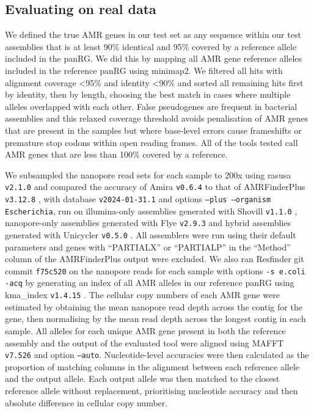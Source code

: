 \subsection*{Evaluating on real data}

We defined the true AMR genes in our test set as any sequence within our test assemblies that is at least 90\% identical and 95\% covered by a reference allele included in the panRG. We did this by mapping all AMR gene reference alleles included in the reference panRG using minimap2. We filtered all hits with alignment coverage <95\% and identity <90\% and sorted all remaining hits first by identity, then by length, choosing the best match in cases where multiple alleles overlapped with each other. False pseudogenes are frequent in bacterial assemblies and this relaxed coverage threshold avoids penalisation of AMR genes that are present in the samples but where base-level errors cause frameshifts or premature stop codons within open reading frames. All of the tools tested call AMR genes that are less than 100\% covered by a reference. 

We subsampled the nanopore read sets for each sample to 200x using rasusa \texttt{v2.1.0} \cite{Hall2022}  and compared the accuracy of Amira \texttt{v0.6.4} to that of AMRFinderPlus \texttt{v3.12.8} \cite{Feldgarden2021}, with database \texttt{v2024-01-31.1} and options \texttt{--plus --organism Escherichia}, run on illumina-only assemblies generated with Shovill \texttt{v1.1.0} \cite{Shovill, Bankevich2012}, nanopore-only assemblies generated with Flye \texttt{v2.9.3} \cite{Kolmogorov2019} and hybrid assemblies generated with Unicycler \texttt{v0.5.0} \cite{Wick2017}. All assemblers were run using their default parameters and genes with “PARTIALX” or “PARTIALP” in the “Method” column of the AMRFinderPlus output were excluded. We also ran Resfinder \cite{Florensa2022} git commit \texttt{f75c520} on the nanopore reads for each sample with options \texttt{-s e.coli -acq} by generating an index of all AMR alleles in our reference panRG using kma\_index \texttt{v1.4.15} \cite{Clausen2018}. The cellular copy numbers of each AMR gene were estimated by obtaining the mean nanopore read depth across the contig for the gene, then normalising by the mean read depth across the longest contig in each sample. All alleles for each unique AMR gene present in both the reference assembly and the output of the evaluated tool were aligned using MAFFT \texttt{v7.526} \cite{mafft} and option \texttt{–auto}. Nucleotide-level accuracies were then calculated as the proportion of matching columns in the alignment between each reference allele and the output allele. Each output allele was then matched to the closest reference allele without replacement, prioritising nucleotide accuracy and then absolute difference in cellular copy number. 

